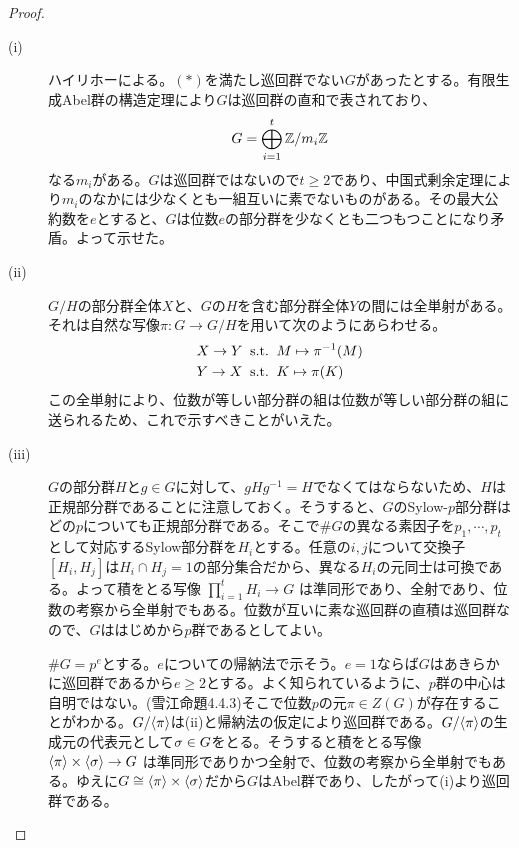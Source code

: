 \begin{proof} ${}$
  \begin{description}
    \item[(i)] ハイリホーによる。$(*)$を満たし巡回群でない$G$があったとする。有限生成Abel群の構造定理により$G$は巡回群の直和で表されており、
    \[
    G = \bigoplus_{i=1}^t {\mathbb Z} / m_i {\mathbb Z}
    \]
    なる$m_i$がある。$G$は巡回群ではないので$t \geq 2$であり、中国式剰余定理により$m_i$のなかには少なくとも一組互いに素でないものがある。その最大公約数を$e$とすると、$G$は位数$e$の部分群を少なくとも二つもつことになり矛盾。よって示せた。
    \item[(ii)] $G/H$の部分群全体$X$と、$G$の$H$を含む部分群全体$Y$の間には全単射がある。それは自然な写像$\pi \colon G \to G/H$を用いて次のようにあらわせる。
    \begin{align*}
      &X \to Y \; \; \text{s.t.} \; \; M \mapsto \pi^{-1}(M) \\
      &Y \to X \; \; \text{s.t.} \; \; K \mapsto \pi(K)
    \end{align*}
    この全単射により、位数が等しい部分群の組は位数が等しい部分群の組に送られるため、これで示すべきことがいえた。
    \item[(iii)] $G$の部分群$H$と$g \in G$に対して、$gHg^{-1} = H$でなくてはならないため、$H$は正規部分群であることに注意しておく。そうすると、$G$のSylow-$p$部分群はどの$p$についても正規部分群である。そこで$\# G$の異なる素因子を$p_1, \cdots ,p_t$として対応するSylow部分群を$H_i$とする。任意の$i,j$について交換子$[H_i,H_j]$は$H_i \cap H_j = 1$の部分集合だから、異なる$H_i$の元同士は可換である。よって積をとる写像
    $
    \prod_{i=1}^t H_i \to G
    $
    は準同形であり、全射であり、位数の考察から全単射でもある。位数が互いに素な巡回群の直積は巡回群なので、$G$ははじめから$p$群であるとしてよい。

    $\# G = p^e$とする。$e$についての帰納法で示そう。$e=1$ならば$G$はあきらかに巡回群であるから$e \geq 2$とする。よく知られているように、$p$群の中心は自明ではない。(雪江\cite{雪代1}命題4.4.3)そこで位数$p$の元$\pi \in Z(G)$が存在することがわかる。$G/\langle \pi \rangle$は(ii)と帰納法の仮定により巡回群である。$G/\langle \pi \rangle$の生成元の代表元として${\sigma} \in G$をとる。そうすると積をとる写像
    $
    \langle \pi \rangle \times \langle {\sigma} \rangle \to G
    $
    は準同形でありかつ全射で、位数の考察から全単射でもある。ゆえに$G \cong \langle \pi \rangle \times \langle {\sigma} \rangle$だから$G$はAbel群であり、したがって(i)より巡回群である。
    \end{description}
\end{proof}

\newpage


